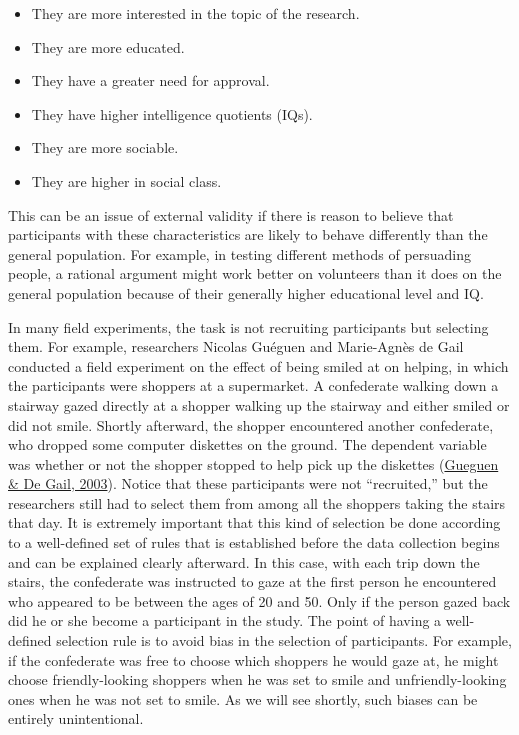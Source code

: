 \documentclass[
]{krantz}
\providecommand{\tightlist}{%
  \setlength{\itemsep}{0pt}\setlength{\parskip}{0pt}}
\begin{document}
\begin{itemize}
\tightlist
\item
  They are more interested in the topic of the research.
\item
  They are more educated.
\item
  They have a greater need for approval.
\item
  They have higher intelligence quotients (IQs).
\item
  They are more sociable.
\item
  They are higher in social class.
\end{itemize}

This can be an issue of external validity if there is reason to believe that participants with these characteristics are likely to behave differently than the general population. For example, in testing different methods of persuading people, a rational argument might work better on volunteers than it does on the general population because of their generally higher educational level and IQ.

In many field experiments, the task is not recruiting participants but selecting them. For example, researchers Nicolas Guéguen and Marie-Agnès de Gail conducted a field experiment on the effect of being smiled at on helping, in which the participants were shoppers at a supermarket. A confederate walking down a stairway gazed directly at a shopper walking up the stairway and either smiled or did not smile. Shortly afterward, the shopper encountered another confederate, who dropped some computer diskettes on the ground. The dependent variable was whether or not the shopper stopped to help pick up the diskettes (\protect\hyperlink{ref-gueguen2003effect}{Gueguen \& De Gail, 2003}). Notice that these participants were not ``recruited,'' but the researchers still had to select them from among all the shoppers taking the stairs that day. It is extremely important that this kind of selection be done according to a well-defined set of rules that is established before the data collection begins and can be explained clearly afterward. In this case, with each trip down the stairs, the confederate was instructed to gaze at the first person he encountered who appeared to be between the ages of 20 and 50. Only if the person gazed back did he or she become a participant in the study. The point of having a well-defined selection rule is to avoid bias in the selection of participants. For example, if the confederate was free to choose which shoppers he would gaze at, he might choose friendly-looking shoppers when he was set to smile and unfriendly-looking ones when he was not set to smile. As we will see shortly, such biases can be entirely unintentional.
\end{document}
